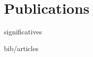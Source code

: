 \documentclass{cv-style}     %
\begin{document}
\section{Publications}{ significatives}

\nocite{vallverdu2016, guille2015, Guille2014, Martin2012, Maillet2011, Vallverdu2010}
\begin{btSect}{bib/articles}
    \btPrintCited
\end{btSect}


%

\end{document}
